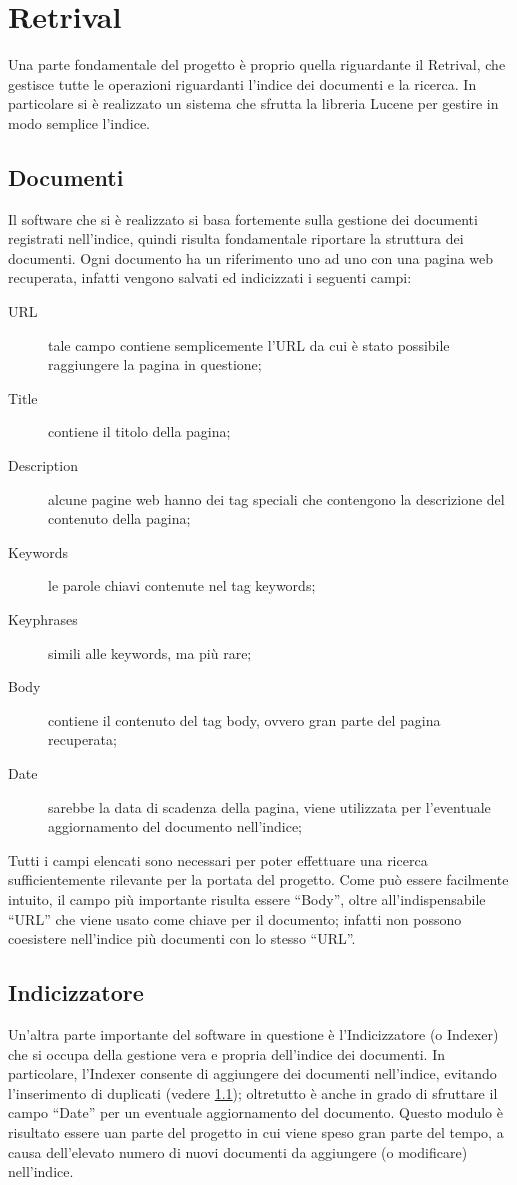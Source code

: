 \chapter{Retrival}\label{cap:retrival}
Una parte fondamentale del progetto è proprio quella riguardante il Retrival, che gestisce tutte le operazioni riguardanti l'indice dei documenti e la ricerca. In particolare si è realizzato un sistema che sfrutta la libreria Lucene per gestire in modo semplice l'indice.
\section{Documenti}\label{cap:retrival:docs}
Il software che si è realizzato si basa fortemente sulla gestione dei documenti registrati nell'indice, quindi risulta fondamentale riportare la struttura dei documenti.
Ogni documento ha un riferimento uno ad uno con una pagina web recuperata, infatti vengono salvati ed indicizzati i seguenti campi:
\begin{description}
\item[URL] tale campo contiene semplicemente l'URL da cui è stato possibile raggiungere la pagina in questione;
\item[Title] contiene il titolo della pagina;
\item[Description] alcune pagine web hanno dei tag speciali che contengono la descrizione del contenuto della pagina;
\item[Keywords] le parole chiavi contenute nel tag keywords;
\item[Keyphrases] simili alle keywords, ma più rare;
\item[Body] contiene il contenuto del tag body, ovvero gran parte del pagina recuperata;
\item[Date] sarebbe la data di scadenza della pagina, viene utilizzata per l'eventuale aggiornamento del documento nell'indice;
\end{description}
Tutti i campi elencati sono necessari per poter effettuare una ricerca sufficientemente rilevante per la portata del progetto. Come può essere facilmente intuito, il campo più importante risulta essere ``Body'', oltre all'indispensabile ``URL'' che viene usato come chiave per il documento; infatti non possono coesistere nell'indice più documenti con lo stesso ``URL''.
\section{Indicizzatore}\label{cap:retrival:indexer}
Un'altra parte importante del software in questione è l'Indicizzatore (o Indexer) che si occupa della gestione vera e propria dell'indice dei documenti. In particolare, l'Indexer consente di aggiungere dei documenti nell'indice, evitando l'inserimento di duplicati (vedere \ref{cap:retrival:docs}); oltretutto è anche in grado di sfruttare il campo ``Date'' per un eventuale aggiornamento del documento.
Questo modulo è risultato essere uan parte del progetto in cui viene speso gran parte del tempo, a causa dell'elevato numero di nuovi documenti da aggiungere (o modificare) nell'indice.
